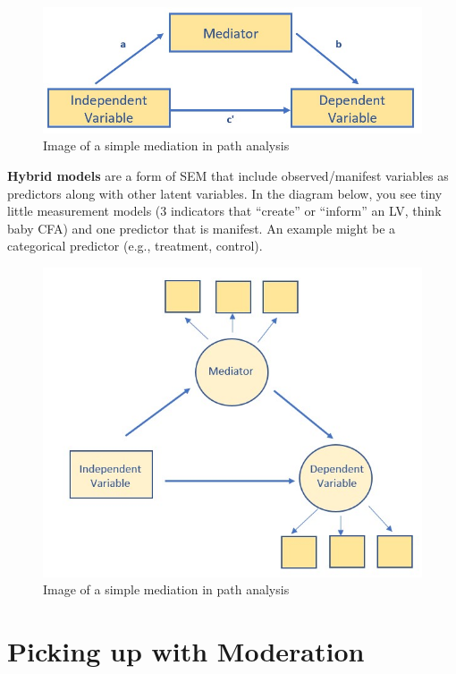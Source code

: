 \documentclass[
  11pt,
]{book}
\begin{document}
\begin{figure}
\centering
\includegraphics{images/SimpleMod/SimpleMed.jpg}
\caption{Image of a simple mediation in path analysis}
\end{figure}

\textbf{Hybrid models} are a form of SEM that include observed/manifest variables as predictors along with other latent variables. In the diagram below, you see tiny little measurement models (3 indicators that ``create'' or ``inform'' an LV, think baby CFA) and one predictor that is manifest. An example might be a categorical predictor (e.g., treatment, control).

\begin{figure}
\centering
\includegraphics{images/SimpleMod/HybridMed.jpg}
\caption{Image of a simple mediation in path analysis}
\end{figure}

\hypertarget{picking-up-with-moderation}{%
\section{Picking up with Moderation}\label{picking-up-with-moderation}}
\end{document}
